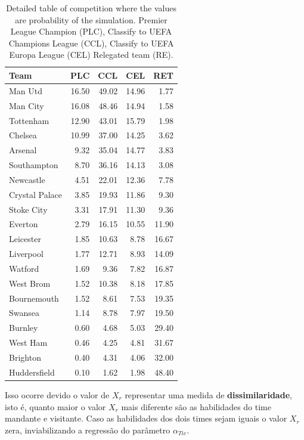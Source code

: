 \documentclass[doc,apacite,oneside,a4paper,12pt]{apa6}
\begin{document}
\begin{table}[ht]
\centering
\begin{tabular}{lrrrr}
  \hline
Team & PLC & CCL& CEL & RET \\ 
  \hline
Man Utd & 16.50 & 49.02 & 14.96 & 1.77 \\ 
  Man City & 16.08 & 48.46 & 14.94 & 1.58 \\ 
  Tottenham & 12.90 & 43.01 & 15.79 & 1.98 \\ 
  Chelsea & 10.99 & 37.00 & 14.25 & 3.62 \\ 
  Arsenal & 9.32 & 35.04 & 14.77 & 3.83 \\ 
  Southampton & 8.70 & 36.16 & 14.13 & 3.08 \\ 
  Newcastle & 4.51 & 22.01 & 12.36 & 7.78 \\ 
  Crystal Palace & 3.85 & 19.93 & 11.86 & 9.30 \\ 
  Stoke City & 3.31 & 17.91 & 11.30 & 9.36 \\ 
  Everton & 2.79 & 16.15 & 10.55 & 11.90 \\ 
  Leicester & 1.85 & 10.63 & 8.78 & 16.67 \\ 
  Liverpool & 1.77 & 12.71 & 8.93 & 14.09 \\ 
  Watford & 1.69 & 9.36 & 7.82 & 16.87 \\ 
  West Brom & 1.52 & 10.38 & 8.18 & 17.85 \\ 
  Bournemouth & 1.52 & 8.61 & 7.53 & 19.35 \\ 
  Swansea & 1.14 & 8.78 & 7.97 & 19.50 \\ 
  Burnley & 0.60 & 4.68 & 5.03 & 29.40 \\ 
  West Ham & 0.46 & 4.25 & 4.81 & 31.67 \\ 
  Brighton & 0.40 & 4.31 & 4.06 & 32.00 \\ 
  Huddersfield & 0.10 & 1.62 & 1.98 & 48.40 \\ 
   \hline
\end{tabular}
    \caption[\scriptsize{TAVB}]{\scriptsize{Detailed table of competition where the values are probability of the simulation. Premier League Champion (PLC), Classify to UEFA Champions League (CCL), Classify to UEFA Europa League (CEL) Relegated team (RE).}}
    \label{tab:forecastdissi}
\end{table}



Isso ocorre devido o valor de $X_r$ representar uma medida de \textbf{dissimilaridade}, isto é, quanto maior o valor $X_r$ mais diferente são as habilidades do time mandante e visitante. Caso as habilidades dos dois times sejam iguais o valor  $X_r$ zera, inviabilizando a regressão do parâmetro $\alpha_{Tie}$. 
\end{document}
